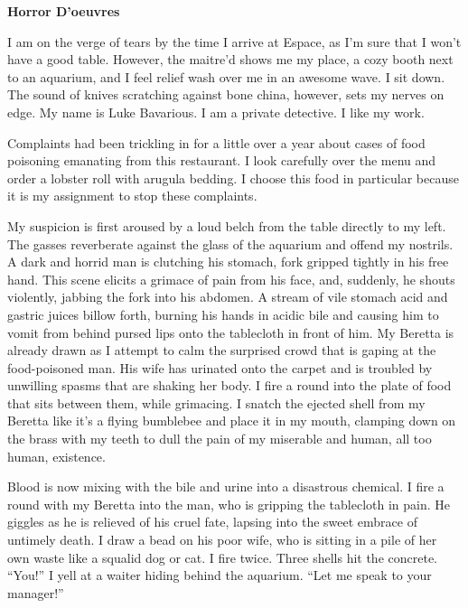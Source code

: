 

{\bf Horror D'oeuvres}



I am on the verge of tears by the time I arrive at Espace, as
I'm sure that I won't have a good table. However, the
maitre'd shows me my place, a cozy booth next to an aquarium,
and I feel relief wash over me in an awesome wave. I sit down. The
sound of knives scratching against bone china, however, sets my
nerves on edge. My name is Luke Bavarious. I am a private
detective. I like my work.



Complaints had been trickling in for a little over a year about
cases of food poisoning emanating from this restaurant. I look
carefully over the menu and order a lobster roll with arugula
bedding. I choose this food in particular because it is my
assignment to stop these complaints.



My suspicion is first aroused by a loud belch from the table
directly to my left. The gasses reverberate against the glass of
the aquarium and offend my nostrils. A dark and horrid man is
clutching his stomach, fork gripped tightly in his free hand. This
scene elicits a grimace of pain from his face, and, suddenly, he
shouts violently, jabbing the fork into his abdomen. A stream of
vile stomach acid and gastric juices billow forth, burning his
hands in acidic bile and causing him to vomit from behind pursed
lips onto the tablecloth in front of him. My Beretta is already
drawn as I attempt to calm the surprised crowd that is gaping at
the food-poisoned man. His wife has urinated onto the carpet and is
troubled by unwilling spasms that are shaking her body. I fire a
round into the plate of food that sits between them, while
grimacing. I snatch the ejected shell from my Beretta like
it's a flying bumblebee and place it in my mouth, clamping
down on the brass with my teeth to dull the pain of my miserable
and human, all too human, existence.



Blood is now mixing with the bile and urine into a disastrous
chemical. I fire a round with my Beretta into the man, who is
gripping the tablecloth in pain. He giggles as he is relieved of
his cruel fate, lapsing into the sweet embrace of untimely death. I
draw a bead on his poor wife, who is sitting in a pile of her own
waste like a squalid dog or cat. I fire twice. Three shells hit the
concrete. ``You!'' I yell at a waiter hiding behind the
aquarium. ``Let me speak to your manager!''



